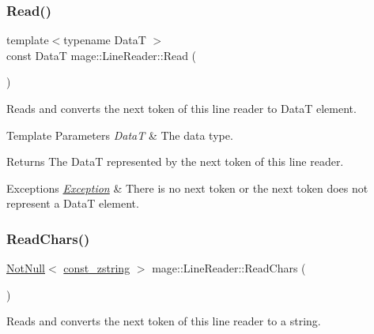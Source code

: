 \subsubsection{\texorpdfstring{Read()}{Read()}}
{\footnotesize\ttfamily template$<$typename DataT $>$ \\
const DataT mage\+::\+Line\+Reader\+::\+Read (\begin{DoxyParamCaption}{ }\end{DoxyParamCaption})\hspace{0.3cm}{\ttfamily [protected]}}

Reads and converts the next token of this line reader to {\ttfamily DataT} element.


\begin{DoxyTemplParams}{Template Parameters}
{\em DataT} & The data type. \\
\hline
\end{DoxyTemplParams}
\begin{DoxyReturn}{Returns}
The {\ttfamily DataT} represented by the next token of this line reader. 
\end{DoxyReturn}

\begin{DoxyExceptions}{Exceptions}
{\em \hyperlink{classmage_1_1_exception}{Exception}} & There is no next token or the next token does not represent a {\ttfamily DataT} element. \\
\hline
\end{DoxyExceptions}
\hypertarget{classmage_1_1_line_reader_afcb163cbc75ad1650437d809bbbc2d9b}{}\label{classmage_1_1_line_reader_afcb163cbc75ad1650437d809bbbc2d9b} 
\subsubsection{\texorpdfstring{Read\+Chars()}{ReadChars()}}
{\footnotesize\ttfamily \hyperlink{namespacemage_a8769f9d670d6b585ea306cb1062af94b}{Not\+Null}$<$ \hyperlink{namespacemage_abfd9206dc607ceb5d13ec68bf075a5c0}{const\+\_\+zstring} $>$ mage\+::\+Line\+Reader\+::\+Read\+Chars (\begin{DoxyParamCaption}{ }\end{DoxyParamCaption})\hspace{0.3cm}{\ttfamily [protected]}}

Reads and converts the next token of this line reader to a string.

